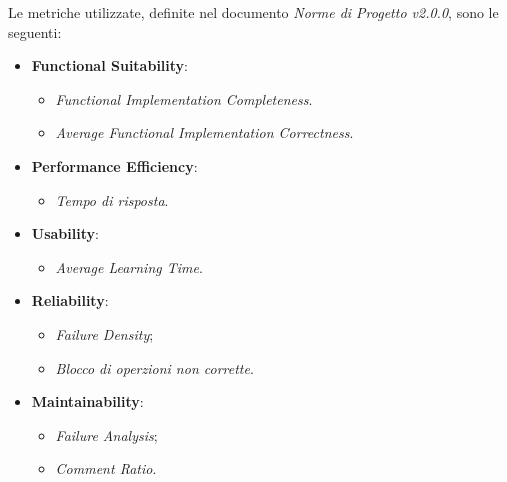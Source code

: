 Le metriche utilizzate, definite nel documento \emph{Norme di Progetto v2.0.0}, sono le seguenti:
\begin{itemize}
	\item{\textbf{Functional Suitability}:
		\begin{itemize}
			\item{\emph{Functional Implementation Completeness}.}
			\item{\emph{Average Functional Implementation Correctness}.}			
		\end{itemize}	
	}
	\item{\textbf{Performance Efficiency}:
		\begin{itemize}
			\item{\emph{Tempo di risposta}.}
		\end{itemize}
	}
	\item{\textbf{Usability}: 
		\begin{itemize}
			\item{\emph{Average Learning Time}.}
		\end{itemize}	
	}
	\item{\textbf{Reliability}: 
		\begin{itemize}
			\item{\emph{Failure Density};}
			\item{\emph{Blocco di operzioni non corrette}.}
		\end{itemize}	
	}
	\item{\textbf{Maintainability}: 
		\begin{itemize}
			\item{\emph{Failure Analysis};}
			\item{\emph{Comment Ratio}.}
		\end{itemize}	
	}
\end{itemize}


